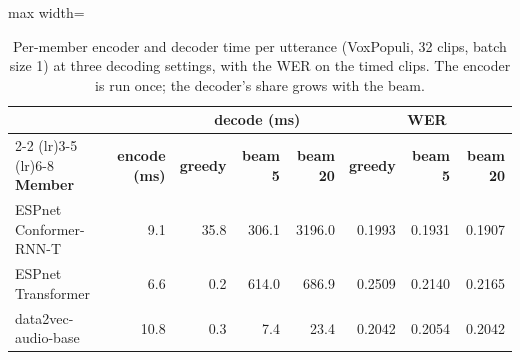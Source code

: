 \begin{table}[t]
    \centering
    \caption{Per-member encoder and decoder time per utterance (VoxPopuli, 32 clips, batch size 1) at three decoding settings, with the WER on the timed clips. The encoder is run once; the decoder's share grows with the beam.}
    \label{tab:clocks_voxpopuli} \footnotesize \setlength{\tabcolsep}{3pt}
    \begin{adjustbox}{max width=\linewidth}
    \begin{tabular}{lrrrrrrr}
        \toprule
         & \multicolumn{1}{c}{\textbf{}} & \multicolumn{3}{c}{\textbf{decode (ms)}} & \multicolumn{3}{c}{\textbf{WER}} \\ \cmidrule(lr){2-2} \cmidrule(lr){3-5} \cmidrule(lr){6-8}
    \textbf{Member} & \textbf{encode (ms)} & \textbf{greedy} & \textbf{beam 5} & \textbf{beam 20} & \textbf{greedy} & \textbf{beam 5} & \textbf{beam 20} \\
        \midrule
        ESPnet Conformer-RNN-T & 9.1 & 35.8 & 306.1 & 3196.0 & 0.1993 & 0.1931 & 0.1907 \\
        ESPnet Transformer & 6.6 & 0.2 & 614.0 & 686.9 & 0.2509 & 0.2140 & 0.2165 \\
        data2vec-audio-base & 10.8 & 0.3 & 7.4 & 23.4 & 0.2042 & 0.2054 & 0.2042 \\
        \bottomrule
    \end{tabular}
    \end{adjustbox}
\end{table}
